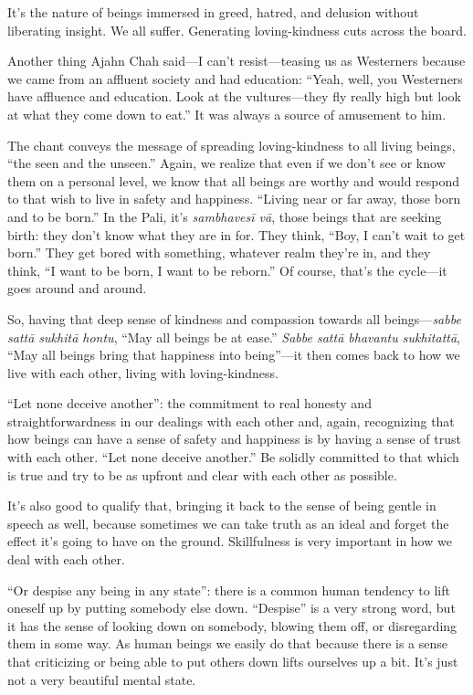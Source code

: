 It’s the nature of beings immersed in greed, hatred, and delusion
without liberating insight. We all suffer. Generating loving-kindness
cuts across the board.

Another thing Ajahn Chah said—I can’t resist—teasing us as Westerners
because we came from an affluent society and had education: “Yeah, well,
you Westerners have affluence and education. Look at the vultures—they
fly really high but look at what they come down to eat.” It was always a
source of amusement to him.

The chant conveys the message of spreading loving-kindness to all living
beings, “the seen and the unseen.” Again, we realize that even if we
don’t see or know them on a personal level, we know that all beings are
worthy and would respond to that wish to live in safety and happiness.
“Living near or far away, those born and to be born.” In the Pali, it’s
\emph{sambhavesī vā}, those beings that are seeking birth: they don’t
know what they are in for. They think, “Boy, I can’t wait to get born.”
They get bored with something, whatever realm they’re in, and they
think, “I want to be born, I want to be reborn.” Of course, that’s the
cycle—it goes around and around.

So, having that deep sense of kindness and compassion towards all
beings—\emph{sabbe sattā sukhitā hontu}, “May all beings be at ease.”
\emph{Sabbe sattā bhavantu sukhitattā}, “May all beings bring that
happiness into being”—it then comes back to how we live with each other,
living with loving-kindness.

“Let none deceive another”: the commitment to real honesty and
straightforwardness in our dealings with each other and, again,
recognizing that how beings can have a sense of safety and happiness is
by having a sense of trust with each other. “Let none deceive another.”
Be solidly committed to that which is true and try to be as upfront and
clear with each other as possible.

It’s also good to qualify that, bringing it back to the sense of being
gentle in speech as well, because sometimes we can take truth as an
ideal and forget the effect it’s going to have on the ground.
Skillfulness is very important in how we deal with each other.

“Or despise any being in any state”: there is a common human tendency to
lift oneself up by putting somebody else down. “Despise” is a very
strong word, but it has the sense of looking down on somebody, blowing
them off, or disregarding them in some way. As human beings we easily do
that because there is a sense that criticizing or being able to put
others down lifts ourselves up a bit. It’s just not a very beautiful
mental state.


